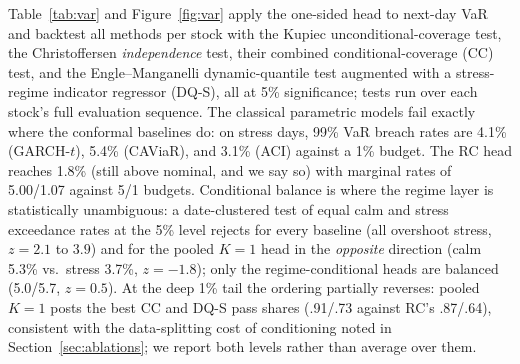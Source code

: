 Table~\ref{tab:var} and Figure~\ref{fig:var} apply the one-sided head
to next-day VaR and backtest all methods per stock with the Kupiec
unconditional-coverage test, the Christoffersen \emph{independence}
test, their combined conditional-coverage (CC) test, and the
Engle--Manganelli dynamic-quantile test augmented with a stress-regime
indicator regressor (DQ-S), all at 5\% significance; tests run over
each stock's full evaluation sequence. The classical parametric models
fail exactly where the conformal baselines do: on stress days, 99\% VaR
breach rates are 4.1\% (GARCH-$t$), 5.4\% (CAViaR), and 3.1\% (ACI)
against a 1\% budget. The RC head reaches 1.8\% (still above nominal,
and we say so) with marginal rates of 5.00/1.07 against 5/1 budgets.
Conditional balance is where the regime layer is statistically
unambiguous: a date-clustered test of equal calm and stress exceedance
rates at the 5\% level rejects for every baseline (all overshoot
stress, $z = 2.1$ to $3.9$) and for the pooled $K = 1$ head in the
\emph{opposite} direction (calm 5.3\% vs.\ stress 3.7\%, $z = -1.8$);
only the regime-conditional heads are balanced (5.0/5.7, $z = 0.5$). At
the deep 1\% tail the ordering partially reverses: pooled $K = 1$ posts
the best CC and DQ-S pass shares (.91/.73 against RC's .87/.64),
consistent with the data-splitting cost of conditioning noted in
Section~\ref{sec:ablations}; we report both levels rather than average
over them.

